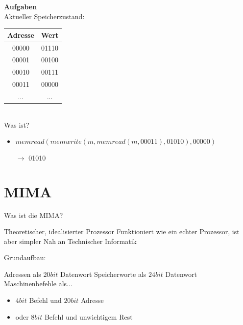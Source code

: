 \documentclass[handout]{beamer}
\begin{document}
\begin{frame}
	\textbf{Aufgaben}\\
	Aktueller Speicherzustand: \\
	\vspace{0.2cm}
	\begin{tabular}{|c| c|}
		\hline
		Adresse & Wert\\
		\hline
		00000& 01110\\
		00001& 00100\\
		00010& 00111\\
		00011& 00000\\
		...& ...\\
		\hline
	\end{tabular}\\
	\vspace{0.3cm}
	Was ist?
	\begin{itemize}
		\item $memread(memwrite(m, memread(m, 00011), 01010), 00000)$ \pause
		\item[$\rightarrow$] 01010
	\end{itemize}
	
\end{frame}

\section{MIMA}

\begin{frame}{Was ist die MIMA?}
	\begin{itemize}
		\pitem Theoretischer, idealisierter Prozessor
		\pitem Funktioniert wie ein echter Prozessor, ist aber simpler
		\pitem Nah an Technischer Informatik
	\end{itemize}

	\bp
	
	Grundaufbau:
	
	\begin{itemize}
		\pitem Adressen als $20bit$ Datenwort
		\pitem Speicherworte als $24bit$ Datenwort
		\pitem Maschinenbefehle als...
		\begin{itemize}
			\item $4bit$ Befehl und $20bit$ Adresse
			\item oder $8bit$ Befehl und unwichtigem Rest
		\end{itemize}
	\end{itemize}
\end{frame}
\end{document}
